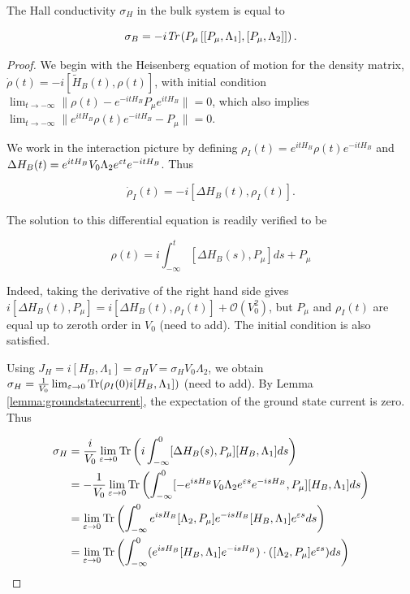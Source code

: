 \documentclass[12pt, letterpaper]{article}
\begin{document}
\begin{proposition}

The Hall conductivity $\sigma_H$ in the bulk system is equal to 

\[\sigma_B = -i\emph{Tr}\left(P_\mu \left[[P_\mu,\Lambda_1],[P_\mu,\Lambda_2]\right]\right).\]
\end{proposition}
\begin{proof}
We begin with the Heisenberg equation of motion for the density matrix, $\dot{\rho}(t) = - i[\widetilde{H}_B(t),\rho(t)]$, with initial condition $\lim_{t\to-\infty} \|\rho(t) - e^{-itH_B}P_\mu e^{itH_B}\| = 0$, which also implies $\lim_{t\to-\infty} \|e^{itH_B}\rho(t)e^{-itH_B} - P_\mu\| = 0$.

We work in the interaction picture by defining $\rho_I(t) = e^{itH_B}\rho(t)e^{-itH_B}$ and $\Delta H_B(t) = e^{itH_B}V_0\Lambda_2 e^{\varepsilon t}e^{-itH_B}$. Thus

\[\dot{\rho}_I(t) = -i[\Delta H_B(t), \rho_I(t)].\]

The solution to this differential equation is readily verified to be

\[\rho(t) = i\int_{-\infty}^t [\Delta H_B(s), P_\mu]ds + P_\mu \]

Indeed, taking the derivative of the right hand side gives $i[\Delta H_B(t), P_\mu] = i[\Delta H_B(t), \rho_I(t)] + \mathcal{O}(V_0^2)$, but $P_\mu$ and $\rho_I(t)$ are equal up to zeroth order in $V_0$ (need to add). The initial condition is also satisfied. 

Using $J_H = i[H_B,\Lambda_1] = \sigma_H V = \sigma_H V_0\Lambda_2$, we obtain $\sigma_H = \frac{1}{V_0} \lim_{\varepsilon\to 0} \text{Tr}(\rho_I(0)i[H_B,\Lambda_1])$ (need to add). By Lemma \ref{lemma:groundstatecurrent}, the expectation of the ground state current is zero. Thus

\[\begin{aligned}
\sigma_H &= \frac{i}{V_0} \lim_{\varepsilon\to 0}\text{Tr} \left( i\int_{-\infty}^0 [\Delta H_B(s), P_\mu] [H_B,\Lambda_1] ds\right)\\
&= -\frac{1}{V_0} \lim_{\varepsilon\to 0}\text{Tr} \left( \int_{-\infty}^0 [-e^{isH_B}V_0\Lambda_2 e^{\varepsilon s}e^{-isH_B}, P_\mu] [H_B,\Lambda_1] ds\right)\\
&= \lim_{\varepsilon\to 0}\text{Tr} \left( \int_{-\infty}^0 e^{isH_B}[\Lambda_2, P_\mu]e^{-isH_B}[H_B,\Lambda_1] e^{\varepsilon s}ds\right)\\
&= \lim_{\varepsilon\to 0}\text{Tr} \left( \int_{-\infty}^0 (e^{isH_B}[H_B,\Lambda_1]e^{-isH_B})\cdot([\Lambda_2, P_\mu] e^{\varepsilon s})ds\right)\\
\end{aligned}\]


\end{proof}
\end{document}
